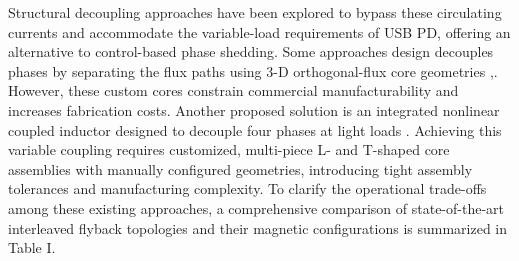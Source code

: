 \documentclass[lettersize,journal]{IEEEtran}
\begin{document}
Structural decoupling approaches have been explored to bypass these circulating currents and accommodate the variable-load requirements of USB PD, offering an alternative to control-based phase shedding. Some approaches design decouples phases by separating the flux paths using  3-D orthogonal-flux core geometries \cite{Ouyang},\cite{fayyaz2025}. However, these custom cores constrain commercial manufacturability and increases fabrication costs. Another proposed solution is an integrated nonlinear coupled inductor designed to decouple four phases at light loads \cite{Z_Li_2025}. Achieving this variable coupling requires customized, multi-piece L- and T-shaped core assemblies with manually configured geometries, introducing tight assembly tolerances and manufacturing complexity. {\color{red}To clarify the operational trade-offs among these existing approaches, a comprehensive comparison of state-of-the-art interleaved flyback topologies and their magnetic configurations is summarized in Table I.}
\end{document}
